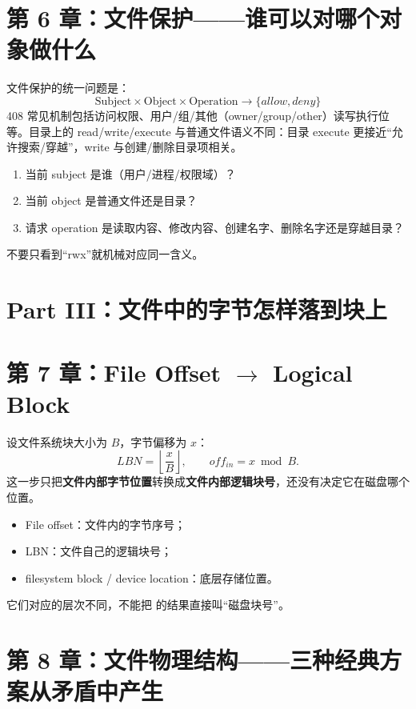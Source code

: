 \documentclass[11pt,a4paper]{ctexart}
\newcommand{\kw}[1]{\textbf{#1}}
\newcommand{\code}[1]{\texttt{\detokenize{#1}}}
\begin{document}
\section{第 6 章：文件保护——谁可以对哪个对象做什么}
文件保护的统一问题是：
\[
\boxed{\text{Subject}\times\text{Object}\times\text{Operation}\to\{allow,deny\}}
\]
408 常见机制包括访问权限、用户/组/其他（owner/group/other）读写执行位等。目录上的 read/write/execute 与普通文件语义不同：目录 execute 更接近“允许搜索/穿越”，write 与创建/删除目录项相关。

\begin{method}[保护题三问]
\begin{enumerate}
  \item 当前 subject 是谁（用户/进程/权限域）？
  \item 当前 object 是普通文件还是目录？
  \item 请求 operation 是读取内容、修改内容、创建名字、删除名字还是穿越目录？
\end{enumerate}
不要只看到“rwx”就机械对应同一含义。
\end{method}

\section{Part III：文件中的字节怎样落到块上}

\section{第 7 章：File Offset $\to$ Logical Block}
设文件系统块大小为 $B$，字节偏移为 $x$：
\[
\boxed{LBN=\left\lfloor\frac{x}{B}\right\rfloor},\qquad
\boxed{off_{in}=x\bmod B}.
\]
这一步只把\kw{文件内部字节位置}转换成\kw{文件内部逻辑块号}，还没有决定它在磁盘哪个位置。

\begin{warn}[三个“地址”不要混]
\begin{itemize}
  \item File offset：文件内的字节序号；
  \item LBN：文件自己的逻辑块号；
  \item filesystem block / device location：底层存储位置。
\end{itemize}
它们对应的层次不同，不能把 \code{offset/B} 的结果直接叫“磁盘块号”。
\end{warn}

\section{第 8 章：文件物理结构——三种经典方案从矛盾中产生}
\end{document}
